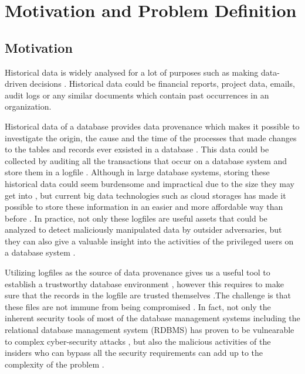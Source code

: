 \chapter{Motivation and Problem Definition} \label{ch:motivation}

	\section{Motivation} \label{sec:motivation}
		Historical data is widely analysed for a lot of purposes such as making data-driven decisions \cite{rose2016datascience}. Historical data could be financial reports, project data, emails, audit logs or any similar documents which contain past occurrences in an organization.

		Historical data of a database provides data provenance which makes it possible to investigate the origin, the cause and the time of the processes that made changes to the tables and records ever exsisted in a database \cite{cheney2009provenance}. This data could be collected by auditing all the transactions that occur on a database system and store them in a logfile \cite{ghoshal2013provenance}. Although in large database systems, storing these historical data could seem burdensome and impractical due to the size they may get into \cite{crosby2009tamper-evident}, but current big data technologies such as cloud storages has made it possible to store these information in an easier and more affordable way than before \cite{talia2015dataanalysis}. In practice, not only these logfiles are useful assets that could be analyzed to detect maliciously manipulated data by outsider adversaries, but they can also give a valuable insight into the activities of the privileged users on a database system \cite{sinha2014continuous}.

		Utilizing logfiles as the source of data provenance gives us a useful tool to establish a trustworthy database environment \cite{viglas2013DataProvenance}, however this requires to make sure that the records in the logfile are trusted themselves \cite{Dai2008anapproach}.The challenge is that these files are not immune from being compromised \cite{wagner2018detect}\cite{lin2015secure}. In fact, not only the inherent security tools of most of the database management systems including the relational database management system (RDBMS) has proven to be vulnearable to complex cyber-security attacks \cite{wanger2017carving}, but also the malicious activities of the insiders who can bypass all the security requirements can add up to the complexity of the problem \cite{wagner2018detect}.

